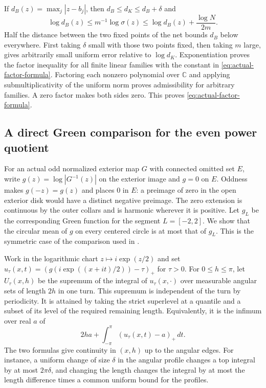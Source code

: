 \documentclass[11pt]{article}
\begin{document}
	If $d_B(z)=\max_j|z-b_j|$, then $d_B\le d_K\le d_B+\delta$ and
	\[
	\log d_B(z)\le m^{-1}\log\sigma(z)\le
	\log d_B(z)+\frac{\log N}{2m}.
	\]
	Half the distance between the two fixed points of the net bounds
	$d_B$ below everywhere. First taking $\delta$ small with those two
	points fixed, then taking $m$ large, gives arbitrarily small uniform
	error relative to $\log d_K$. Exponentiation proves the factor
	inequality for all finite linear families with the constant in
	\eqref{eq:actual-factor-formula}. Factoring each nonzero polynomial
	over $\mathbb C$ and applying submultiplicativity of the uniform norm
	proves admissibility for arbitrary families. A zero factor makes both
	sides zero. This proves \eqref{eq:actual-factor-formula}.
	\subsection{A direct Green comparison for the even power quotient}
	\label{sec:verified-green-comparison}
	
	For an actual odd normalized exterior map $G$ with connected omitted
	set $E$, write $g(z)=\log|G^{-1}(z)|$ on the exterior image and $g=0$
	on $E$. Oddness makes $g(-z)=g(z)$ and places $0$ in $E$: a preimage of
	zero in the open exterior disk would have a distinct negative
	preimage. The zero extension is continuous by the outer collars and
	is harmonic wherever it is positive. Let $g_L$ be the corresponding
	Green function for the segment $L=[-2,2]$. We show that the circular
	mean of $g$ on every centered circle is at most that of $g_L$.
	This is the symmetric case of the comparison used in
	\cite[Section~6]{BLP}.
	
	Work in the logarithmic chart $z\mapsto i\exp(z/2)$ and set
	$u_\tau(x,t)=(g(i\exp((x+it)/2))-\tau)_+$ for $\tau>0$.
	For $0\le h\le\pi$, let $U_\tau(x,h)$ be the supremum of the
	integral of $u_\tau(x,\cdot)$ over measurable angular sets of length
	$2h$ in one turn. This supremum is independent of the turn by
	periodicity. It is attained by taking the strict superlevel at a
	quantile and a subset of its level of the required remaining length.
	Equivalently, it is the infimum over real $a$ of
	\[
	2ha+\int_{-\pi}^{\pi}(u_\tau(x,t)-a)_+\,dt.
	\]
	The two formulas give continuity in $(x,h)$ up to the angular edges.
	For instance, a uniform change of size $\delta$ in the angular
	profile changes a top integral by at most $2\pi\delta$, and changing
	the length changes the integral by at most the length difference
	times a common uniform bound for the profiles.
	
\end{document}
